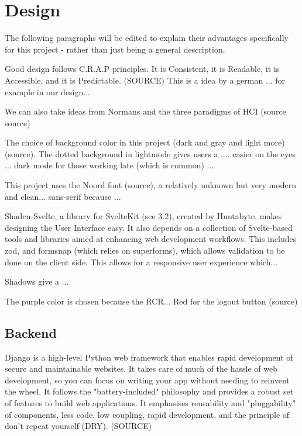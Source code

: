 \section{Design}
The following paragraphs will be edited to explain their advantages specifically for this project - rather than just being a general description.

Good design follows C.R.A.P principles. It is Consistent, it is Readable, it is Accessible, and it is Predictable. (SOURCE) This is a idea by a german ... for example in our design...

We can also take ideas from Normans and the three paradigms of HCI (source source)

The choice of background color in this project (dark and gray and light more) (source). The dotted background in lightmode gives users a .... easier on the eyes ... dark mode for those working late (which is common) ...

This project uses the Noord font (source), a relatively unknown but very modern and clean... sans-serif because ...

Shadcn-Svelte, a library for SvelteKit (see 3.2), created by Huntabyte, makes designing the User Interface easy. It also depends on a collection of Svelte-based tools and libraries aimed at enhancing web development workflows. This includes zod, and formsnap (which relies on superforms), which allows validation to be done on the client side. This allows for a responsive user experience which...

Shadows give a ...

The purple color is chosen because the RCR... Red for the logout button (source)
\subsection{Backend}
Django is a high-level Python web framework that enables rapid development of secure and maintainable websites. It takes care of much of the hassle of web development, so you can focus on writing your app without needing to reinvent the wheel. It follows the "battery-included" philosophy and provides a robust set of features to build web applications. It emphasises reusability and "pluggability" of components, less code, low coupling, rapid development, and the principle of don't repeat yourself (DRY). (SOURCE)

